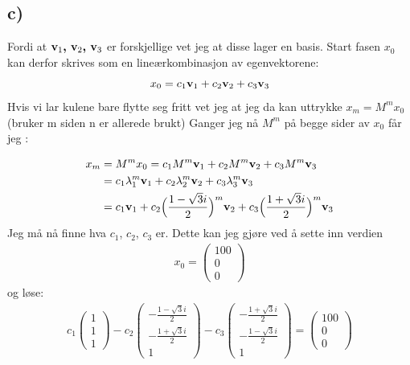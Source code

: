 \documentclass[a4paper,12pt,norsk]{article}
\begin{document}
\subsection{c)}
Fordi at $\bold{v}_1 \textbf{, }\bold{v}_2\textbf{, }\bold{v}_3$ er forskjellige vet jeg at disse lager en basis. Start fasen $x_0$ kan derfor skrives som en lineærkombinasjon av egenvektorene: 
$$x_0 = c_1\bold{v}_1 + c_2\bold{v}_2 + c_3\bold{v}_3 $$
Hvis vi lar kulene bare flytte seg fritt vet jeg at jeg da kan uttrykke $x_m = M^mx_0$ (bruker m siden n er allerede brukt) Ganger jeg nå $M^m$ på begge sider av $x_0$ får jeg :

\begin{align*}
x_m &= M^mx_0 = c_1M^m\bold{v}_1 + c_2M^m\bold{v}_2 + c_3M^m\bold{v}_3\\
&= c_1\lambda_1^m\bold{v}_1 + c_2\lambda_2^m\bold{v}_2 + c_3\lambda_3^m\bold{v}_3\\
& = c_1\bold{v}_1 + c_2\Big(\frac{1-\sqrt{3}i}{2}\Big)^m\bold{v}_2 + c_3\Big(\frac{1+\sqrt{3}i}{2}\Big)^m\bold{v}_3\\
\end{align*}
Jeg må nå finne hva $c_1$, $c_2$, $c_3$ er. Dette kan jeg gjøre ved å sette inn verdien 
\begin{align*}
x_0 = 
\begin{pmatrix} 100\\ 0\\ 0 \end{pmatrix}
\end{align*} og løse:  
 \begin{align*}
 c_1 \left({\begin{array}{cc} 1\\ 1\\ 1  \end{array}}\right) - 
 c_2 \left({\begin{array}{cc} -\frac{1-\sqrt{3}i}{2}\\ -\frac{1+\sqrt{3}i}{2}\\ 1  \end{array}}\right) -
 c_3 \left({\begin{array}{cc} -\frac{1+\sqrt{3}i}{2}\\ -\frac{1-\sqrt{3}i}{2}\\ 1  \end{array}}\right) = 
 \begin{pmatrix} 100\\ 0\\ 0 \end{pmatrix}\\
 \end{align*}
\end{document}
